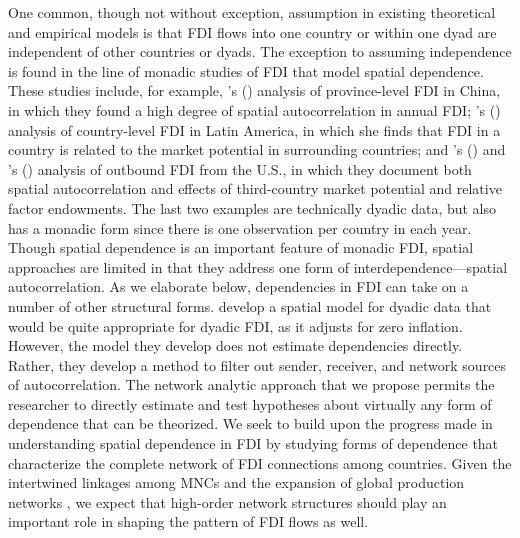 \documentclass[reqno,onecolumn,letterpaper,12pt]{article}
\newcommand\citeapos[1]{\citeauthor{#1}'s (\citeyear{#1})}
\begin{document}
One common, though not without exception, assumption in existing theoretical and empirical models is that FDI flows into one country or within one dyad are independent of other countries or dyads.  The exception to assuming independence is found in the line of monadic studies of FDI that model spatial dependence. These studies include, for example, \citeapos{coughlin2000foreign} analysis of province-level FDI in China, in which they found a high degree of spatial autocorrelation in annual FDI; \citeapos{blanco2012spatial} analysis of country-level FDI in Latin America, in which she finds that FDI in a country is related to the market potential in surrounding countries; and \citeapos{Baltagi_et_al:2007} and \citeapos{blonigen2007fdi} analysis of outbound FDI from the U.S., in which they document both spatial autocorrelation and effects of third-country market potential and relative factor endowments. The last two examples \citep[i.e.,][]{blonigen2007fdi,Baltagi_et_al:2007} are technically dyadic data, but also has a monadic form since there is one observation per country in each year. Though spatial dependence is an important feature of monadic FDI, spatial approaches are limited in that they address one form of interdependence---spatial autocorrelation. As we elaborate below, dependencies in FDI can take on a number of other structural forms. \citet{metulini2018spatial} develop a spatial model for dyadic data that would be quite appropriate for dyadic FDI, as it adjusts for zero inflation. However, the model they develop does not estimate dependencies directly. Rather, they develop a method to filter out sender, receiver, and network sources of autocorrelation. The network analytic approach that we propose permits the researcher to directly estimate and test hypotheses about virtually any form of dependence that can be theorized.
We seek to build upon the progress made in understanding spatial dependence in FDI by studying forms of dependence that characterize the complete network of FDI connections among countries. Given the intertwined linkages among MNCs and the expansion of global production networks \citep{UNCTAD:2013,Baldwin:2011}, we expect that high-order network structures should play an important role in shaping the pattern of FDI flows as well.
\end{document}
